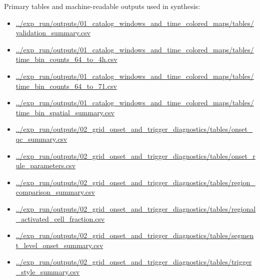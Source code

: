 \documentclass[11pt]{article}
\begin{document}
Primary tables and machine-readable outputs used in synthesis:
\begin{itemize}[leftmargin=1.5em]
    \item \url{../exp_run/outputs/01_catalog_windows_and_time_colored_maps/tables/validation_summary.csv}
    \item \url{../exp_run/outputs/01_catalog_windows_and_time_colored_maps/tables/time_bin_counts_64_to_4h.csv}
    \item \url{../exp_run/outputs/01_catalog_windows_and_time_colored_maps/tables/time_bin_counts_64_to_71.csv}
    \item \url{../exp_run/outputs/01_catalog_windows_and_time_colored_maps/tables/time_bin_spatial_summary.csv}
    \item \url{../exp_run/outputs/02_grid_onset_and_trigger_diagnostics/tables/onset_qc_summary.csv}
    \item \url{../exp_run/outputs/02_grid_onset_and_trigger_diagnostics/tables/onset_rule_parameters.csv}
    \item \url{../exp_run/outputs/02_grid_onset_and_trigger_diagnostics/tables/region_comparison_summary.csv}
    \item \url{../exp_run/outputs/02_grid_onset_and_trigger_diagnostics/tables/regional_activated_cell_fraction.csv}
    \item \url{../exp_run/outputs/02_grid_onset_and_trigger_diagnostics/tables/segment_level_onset_summary.csv}
    \item \url{../exp_run/outputs/02_grid_onset_and_trigger_diagnostics/tables/trigger_style_summary.csv}
\end{itemize}
\end{document}

